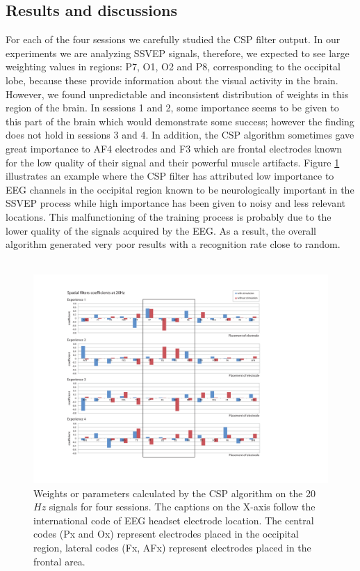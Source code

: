\documentclass{svmult}
\begin{document}
\subsection{Results and discussions}
For each of the four sessions we carefully studied the CSP filter output. In our experiments we are analyzing SSVEP signals, therefore, we expected to see large weighting values in regions: P7, O1, O2 and P8, corresponding to the occipital lobe, because these provide information about the visual activity in the brain. However, we found unpredictable and inconsistent distribution of weights in this region of the brain. In sessions 1 and 2, some importance seems to be given to this part of the brain which would demonstrate some success; however the finding does not hold in sessions 3 and 4. In addition, the CSP algorithm sometimes gave great importance to AF4 electrodes and F3 which are frontal electrodes known for the low quality of their signal and their powerful muscle artifacts. Figure \ref{fig: CSP_20} illustrates an example where the CSP filter has attributed low importance to EEG channels in the occipital region known to be neurologically important in the SSVEP process while high importance has been given to noisy and less relevant locations. This malfunctioning of the training process is probably due to the lower quality of the signals acquired by the EEG. As a result, the overall algorithm generated very poor results with a recognition rate close to random.\\
\\
\begin{figure}
\center
\includegraphics[width = \textwidth] {figures/CSP-20Hz-all.pdf}
\caption{Weights or parameters calculated by the CSP algorithm on the 20$Hz$ signals for four sessions. The captions on the X-axis follow the international code of EEG headset electrode location. The central codes (Px and Ox) represent electrodes placed in the occipital region, lateral codes (Fx, AFx) represent electrodes placed in the frontal area.} \label{fig: CSP_20}
\end{figure}
\end{document}
